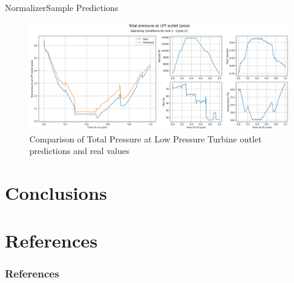 \documentclass{beamer}
\begin{document}
        \begin{frame}{Normalizer}{Sample Predictions}
            \begin{figure}[!htbp]
                \centering
                \includegraphics[scale=0.27]{P50_cycle_22_pred_op_conditions.png}
                \caption{Comparison of Total Pressure at Low Pressure Turbine outlet predictions and real values}
            \end{figure}
        \end{frame}

    \section{Conclusions}

    \section{References}
        \begin{frame}
            \frametitle{References}
            \printbibliography
    \end{frame}
\end{document}
